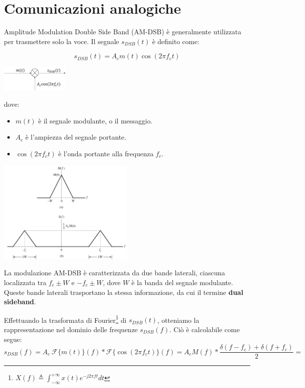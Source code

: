 \section*{Comunicazioni analogiche}

Amplitude Modulation Double Side Band (AM-DSB) è generalmente utilizzata per trasmettere solo la voce.
Il segnale \( s_{DSB}(t) \) è definito come:

\begin{equation*}
    s_{DSB}(t) = A_c m(t) \cos(2\pi f_c t)
\end{equation*}

\begin{center}
    \includegraphics[width=0.25\textwidth]{imgs/analog_pam_trasmitter.png}
\end{center}
dove:
\begin{itemize}
    \item \( m(t) \) è il segnale modulante, o il messaggio.
    \item \( A_c \) è l'ampiezza del segnale portante.
    \item \( \cos(2\pi f_c t) \) è l'onda portante alla frequenza \( f_c \).
\end{itemize}

\begin{center}
    \includegraphics[width=0.5\textwidth]{imgs/dsb.jpg}
\end{center}


La modulazione AM-DSB è caratterizzata da due bande laterali, ciascuna localizzata tra \( f_c \pm W \) e \( -f_c \pm W \), dove \( W \) è la banda del segnale modulante. Queste bande laterali trasportano la stessa informazione, da cui il termine \textbf{dual sideband}.

Effettuando la trasformata di Fourier\footnote{$X(f) \triangleq \int_{-\infty}^{+\infty} x(t) e^{-j2\pi ft} dt$} di \( s_{DSB}(t) \), otteniamo la rappresentazione nel dominio delle frequenze \( s_{DSB}(f) \). Ciò è calcolabile come segue:
\[
    s_{DSB}(f) = A_c \ \mathcal{F}\{m(t)\} (f)  \ast \mathcal{F}\{\cos(2\pi f_c t) \}(f) = A_c M(f) \ast \frac{\delta(f - f_c) + \delta(f + f_c)}{2} =
\]

